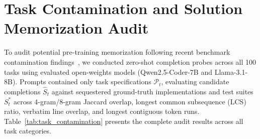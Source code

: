 \documentclass[conference]{IEEEtran}
\begin{document}


\section{Task Contamination and Solution Memorization Audit}
\label{app:task_contamination}

To audit potential pre-training memorization following recent benchmark contamination findings~\cite{openai2026swebenchleakage}, we conducted zero-shot completion probes across all 100 tasks using evaluated open-weights models (Qwen2.5-Coder-7B and Llama-3.1-8B). Prompts contained only task specifications $\mathcal{P}_t$, evaluating candidate completions $\hat{S}_t$ against sequestered ground-truth implementations and test suites $S^*_t$ across 4-gram/8-gram Jaccard overlap, longest common subsequence (LCS) ratio, verbatim line overlap, and longest contiguous token runs. Table~\ref{tab:task_contamination} presents the complete audit results across all task categories.





\end{document}
